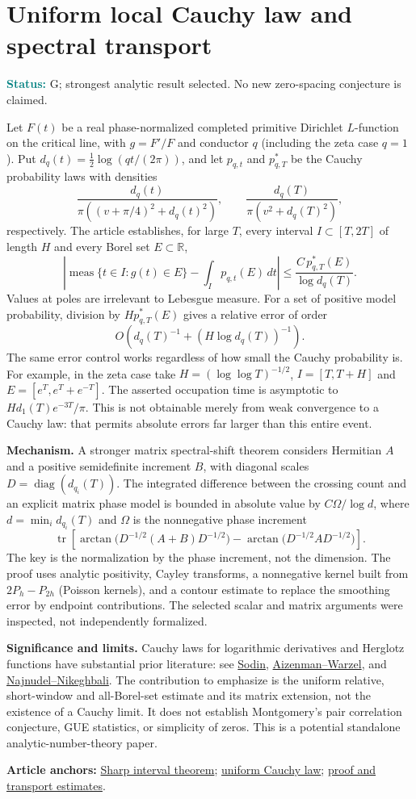 \documentclass[11pt]{article}
\newcommand{\art}[3]{\href{https://github.com/VladimirReshetnikov/ProveIt/blob/3c4d27a69c98d09319a51e41a19fca05bb80a3e2/Analysis/GeneralizedRiemannHypothesis/Article/sections/#1.tex\#L#2}{#3}}
\newcommand{\status}[1]{\par\smallskip\noindent\textcolor{teal}{\textbf{Status:}} #1\par\smallskip}
\newcommand{\sources}[1]{\par\smallskip\noindent\textbf{Article anchors:} #1\par}
\newcommand{\R}{\mathbb R}
\newcommand{\meas}{\operatorname{meas}}
\newcommand{\tr}{\operatorname{tr}}
\begin{document}
\section{Uniform local Cauchy law and spectral transport}
\status{G; strongest analytic result selected. No new zero-spacing conjecture is claimed.}
Let $F(t)$ be a real phase-normalized completed primitive Dirichlet $L$-function on the critical line, with $g=F'/F$ and conductor $q$ (including the zeta case $q=1$). Put $d_q(t)=\tfrac12\log(qt/(2\pi))$, and let $p_{q,t}$ and $p^*_{q,T}$ be the Cauchy probability laws with densities
\[
\frac{d_q(t)}{\pi((v+\pi/4)^2+d_q(t)^2)},\qquad
\frac{d_q(T)}{\pi(v^2+d_q(T)^2)},
\]
respectively. The article establishes, for large $T$, every interval $I\subset[T,2T]$ of length $H$ and every Borel set $E\subset\R$,
\begin{equation*}
\left|\meas\{t\in I:g(t)\in E\}-\int_I p_{q,t}(E)\,dt\right|
\le \frac{C\,p^*_{q,T}(E)}{\log d_q(T)}.
\end{equation*}
Values at poles are irrelevant to Lebesgue measure. For a set of positive model probability, division by $H p^*_{q,T}(E)$ gives a relative error of order
\[
O\left(d_q(T)^{-1}+(H\log d_q(T))^{-1}\right).
\]
The same error control works regardless of how small the Cauchy probability is. For example, in the zeta case take $H=(\log\log T)^{-1/2}$, $I=[T,T+H]$ and $E=[e^T,e^T+e^{-T}]$. The asserted occupation time is asymptotic to $H d_1(T)e^{-3T}/\pi$. This is not obtainable merely from weak convergence to a Cauchy law: that permits absolute errors far larger than this entire event.

\textbf{Mechanism.} A stronger matrix spectral-shift theorem considers Hermitian $A$ and a positive semidefinite increment $B$, with diagonal scales $D=\operatorname{diag}(d_{q_i}(T))$. The integrated difference between the crossing count and an explicit matrix phase model is bounded in absolute value by $C\Omega/\log d$, where $d=\min_i d_{q_i}(T)$ and $\Omega$ is the nonnegative phase increment
\[
\tr\left[\arctan\big(D^{-1/2}(A+B)D^{-1/2}\big)-\arctan\big(D^{-1/2}AD^{-1/2}\big)\right].
\]
The key is the normalization by the phase increment, not the dimension. The proof uses analytic positivity, Cayley transforms, a nonnegative kernel built from $2P_h-P_{2h}$ (Poisson kernels), and a contour estimate to replace the smoothing error by endpoint contributions. The selected scalar and matrix arguments were inspected, not independently formalized.

\textbf{Significance and limits.} Cauchy laws for logarithmic derivatives and Herglotz functions have substantial prior literature: see \href{https://doi.org/10.1093/qmath/hax033}{Sodin}, \href{https://doi.org/10.1007/s00440-014-0587-3}{Aizenman--Warzel}, and \href{https://arxiv.org/abs/2609.15862}{Najnudel--Nikeghbali}. The contribution to emphasize is the uniform relative, short-window and all-Borel-set estimate and its matrix extension, not the existence of a Cauchy limit. It does not establish Montgomery's pair correlation conjecture, GUE statistics, or simplicity of zeros. This is a potential standalone analytic-number-theory paper.
\sources{\art{zer}{6533}{Sharp interval theorem}; \art{zer}{6618}{uniform Cauchy law}; \art{zer}{6547}{proof and transport estimates}.}
\clearpage
\end{document}
